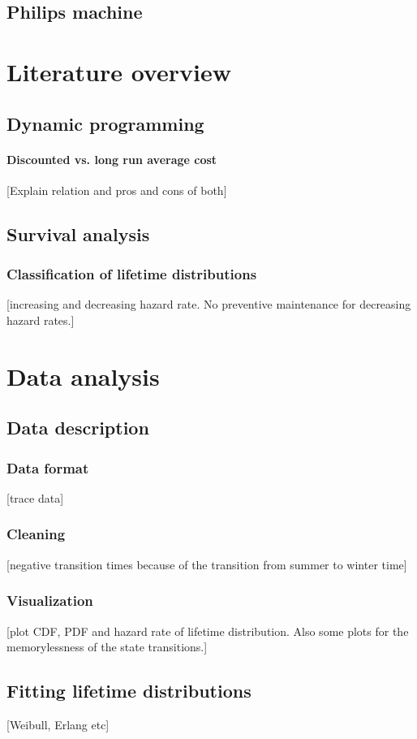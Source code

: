 \section{Philips machine}

\chapter{Literature overview}
\section{Dynamic programming}
\subsubsection{Discounted vs. long run average cost}
[Explain relation and pros and cons of both]
\section{Survival analysis}
\subsection{Classification of lifetime distributions}
[increasing and decreasing hazard rate. No preventive maintenance for decreasing hazard rates.]

\chapter{Data analysis}
\section{Data description}
\subsection{Data format}
[trace data]
\subsection{Cleaning}
[negative transition times because of the transition from summer to winter time]
\subsection{Visualization}
[plot CDF, PDF and hazard rate of lifetime distribution. Also some plots for the memorylessness of the state transitions.]
\section{Fitting lifetime distributions}
[Weibull, Erlang etc]
